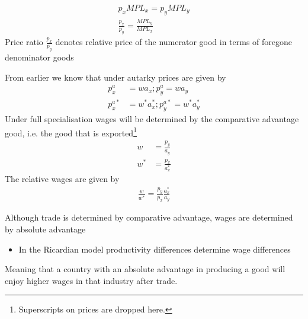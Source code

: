 \documentclass{beamer}
\begin{document}
\begin{frame}
  \begin{align*}
    p_x MPL_x= p_y MPL_y\\
    \frac{p_x}{p_y}=\frac{MPL_y}{MPL_x}
  \end{align*}
  Price ratio $\frac{p_x}{p_y}$ denotes relative price of the numerator good in terms of foregone denominator goods
\end{frame}

\begin{frame}
  From earlier we know that under autarky prices are given by
  \begin{align*}
    p_x^a &= wa_x; p_y^a=wa_y\\
    p_x^{a*} &= w^*a_x^*; p_y^{a*}=w^*a_y^* 
  \end{align*}
  \medskip
  Under full specialisation wages will be determined by the comparative advantage good, i.e. the good that is exported\footnote{Superscripts on prices are dropped here.}
  \begin{align*}
    w &= \frac{p_y}{a_y}\\
    w^* &= \frac{p_x}{a_x^*}
  \end{align*}
  \medskip
  The relative wages are given by
  \begin{align*}
    \frac{w}{w^*} = \frac{p_y}{p_x} \frac{a_x^*}{a_y}
  \end{align*}
\end{frame}

\begin{frame}
  Although trade is determined by comparative advantage, wages are determined by absolute advantage
  \begin{itemize}
    \item In the Ricardian model productivity differences determine wage differences
  \end{itemize}
  \medskip
  Meaning that a country with an absolute advantage in producing a good will enjoy higher wages in that industry after trade.
\end{frame}
\end{document}
